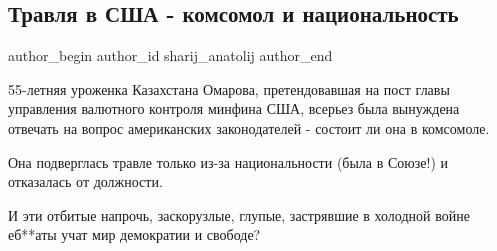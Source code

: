  
 
 
 
 
 
\subsection{Травля в США - комсомол и национальность}
\label{sec:09_12_2021.fb.sharij_anatolij.1.travlja_usa_komsomol}
 
\ifcmt
 author_begin
   author_id sharij_anatolij
 author_end
\fi

55-летняя уроженка Казахстана Омарова, претендовавшая на пост главы управления
валютного контроля минфина США, всерьез была вынуждена отвечать на вопрос
американских законодателей - состоит ли она в комсомоле. 

Она подверглась травле только из-за национальности (была в Союзе!) и отказалась
от должности. 

И эти отбитые напрочь, заскорузлые, глупые, застрявшие в холодной войне еб**аты
учат мир демократии и свободе?

